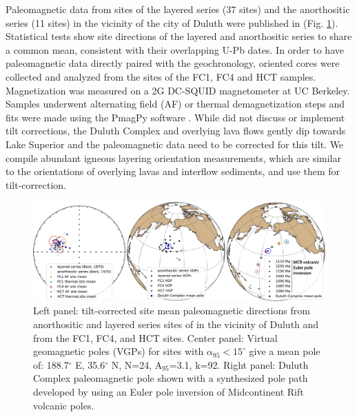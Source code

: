 \documentclass[11pt,letterpaper]{article}
\begin{document}
Paleomagnetic data from sites of the layered series (37 sites) and the anorthositic series (11 sites) in the vicinity of the city of Duluth were published in \cite{Beck1970a} (Fig. \ref{fig:poles}). Statistical tests show site directions of the layered and anorthositic series to share a common mean, consistent with their overlapping U-Pb dates. In order to have paleomagnetic data directly paired with the geochronology, oriented cores were collected and analyzed from the sites of the FC1, FC4 and HCT samples. Magnetization was measured on a 2G DC-SQUID magnetometer at UC Berkeley. Samples underwent alternating field (AF) or thermal demagnetization steps and fits were made using the PmagPy software \citep{Tauxe2016a}. While \cite{Beck1970a} did not discuss or implement tilt corrections, the Duluth Complex and overlying lava flows gently dip towards Lake Superior and the paleomagnetic data need to be corrected for this tilt. We compile abundant igneous layering orientation measurements, which are similar to the orientations of overlying lavas and interflow sediments, and use them for tilt-correction.

\begin{figure}[!ht]
\noindent\includegraphics[width=\textwidth]{./Figures/Duluth_Complex_pole.pdf}
\caption{\small{Left panel: tilt-corrected site mean paleomagnetic directions from anorthositic and layered series sites of \cite{Beck1970a} in the vicinity of Duluth and from the FC1, FC4, and HCT sites. Center panel: Virtual geomagnetic poles (VGPs) for sites with $\alpha_{95}<15^{\circ}$ give a mean pole of: 188.7$^{\circ}$ E, 35.6$^{\circ}$ N, N=24, A$_{95}$=3.1, k=92. Right panel: Duluth Complex paleomagnetic pole shown with a synthesized pole path developed by \citealp{Swanson-Hysell2019a} using an Euler pole inversion of Midcontinent Rift volcanic poles.}}
\label{fig:poles}
\end{figure}
\end{document}

